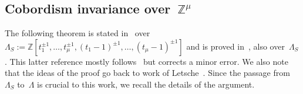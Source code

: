 \documentclass[10.9pt,a4paper]{amsart}
\theoremstyle{definition}
\theoremstyle{remark}
\newcommand{\Z}{\mathbb{Z}}
\begin{document}
\subsection{Cobordism invariance over~$\Z^\mu$}
\label{sub:CobordismInvarianceBlanchfield}

The following theorem is stated in~\cite[Proposition~2.7]{BorodzikFriedlPowell} over~$\Lambda_S:=\Z[t_1^{\pm 1},\dots,t_\mu^{\pm 1},(t_1-1)^{\pm 1},\dots,(t_\mu-1)^{\pm 1}]$ and is proved in~\cite[Theorem~B]{KimWhitney}, also over~$\Lambda_S$.
This latter reference mostly follows~\cite[Theorem 2.4]{Hillman} but corrects a minor error.
We also note that the ideas of the proof go back to work of Letsche~\cite[Proposition 2.8]{Letsche}.
Since the passage from~$\Lambda_S$ to~$\Lambda$ is crucial to this work,  we recall the details of the argument.
\end{document}
